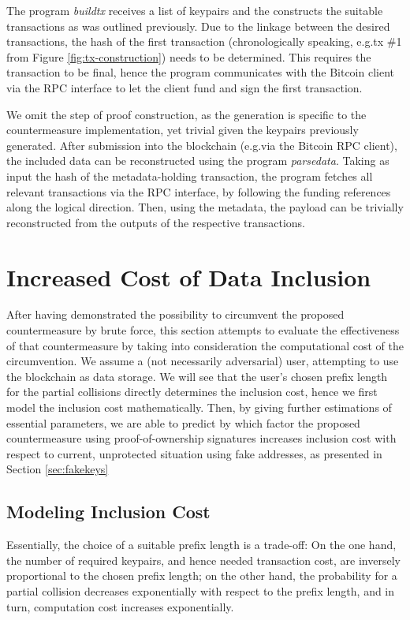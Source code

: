 \documentclass[a4paper,11pt,titlepage]{scrbook}
\begin{document}
The program \emph{buildtx} receives a list of keypairs and the constructs the suitable transactions as was outlined previously.
Due to the linkage between the desired transactions, the hash of the first transaction (chronologically speaking, e.g.\@ tx \#1 from Figure \ref{fig:tx-construction}) needs to be determined.
This requires the transaction to be final, hence the program communicates with the Bitcoin client via the RPC interface to let the client fund and sign the first transaction.

We omit the step of proof construction, as the generation is specific to the countermeasure implementation, yet trivial given the keypairs previously generated.
After submission into the blockchain (e.g.\@ via the Bitcoin RPC client), the included data can be reconstructed using the program \emph{parsedata}.
Taking as input the hash of the metadata-holding transaction, the program fetches all relevant transactions via the RPC interface, by following the funding references along the logical direction.
Then, using the metadata, the payload can be trivially reconstructed from the outputs of the respective transactions.


\chapter{Increased Cost of Data Inclusion}\label{chap:evaluation}

After having demonstrated the possibility to circumvent the proposed countermeasure by brute force, this section attempts to evaluate the effectiveness of that countermeasure by taking into consideration the computational cost of the circumvention.
We assume a (not necessarily adversarial) user, attempting to use the blockchain as data storage.
We will see that the user's chosen prefix length for the partial collisions directly determines the inclusion cost, hence we first model the inclusion cost mathematically. Then, by giving further estimations of essential parameters, we are able to predict by which factor the proposed countermeasure using proof-of-ownership signatures increases inclusion cost with respect to current, unprotected situation using fake addresses, as presented in Section \ref{sec:fakekeys}

\section{Modeling Inclusion Cost}

Essentially, the choice of a suitable prefix length is a trade-off:
On the one hand, the number of required keypairs, and hence needed transaction cost, are inversely proportional to the chosen prefix length;
on the other hand, the probability for a partial collision decreases exponentially with respect to the prefix length, and in turn, computation cost increases exponentially.
\end{document}
